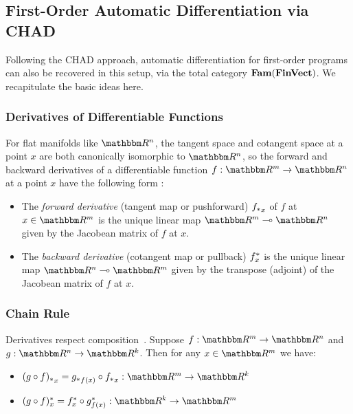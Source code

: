 
\subsection{First-Order Automatic Differentiation via CHAD}

Following the CHAD approach, automatic differentiation for first-order programs can also be recovered in this
setup, via the total category $\mathbf{Fam}(\mathbf{FinVect})$. We recapitulate the basic ideas here.

\subsubsection{Derivatives of Differentiable Functions}

For flat manifolds like $\RR^n$, the tangent space and cotangent space at a point $x$ are both canonically
isomorphic to $\RR^n$, so the forward and backward derivatives of a differentiable function $f: \RR^m \to
\RR^n$ at a point $x$ have the following form :

\begin{itemize}
\item The \emph{forward derivative} (tangent map or pushforward) ${f_{*}}_x$ of $f$ at $x \in \RR^m$ is the
unique linear map $\RR^m \linearto \RR^n$ given by the Jacobean matrix of $f$ at $x$.
\item The \emph{backward derivative} (cotangent map or pullback) $f^{*}_x$ is the unique linear map
$\RR^n \linearto \RR^m$ given by the transpose (adjoint) of the Jacobean matrix of $f$ at $x$.
\end{itemize}

\subsubsection{Chain Rule}

Derivatives respect composition~\cite{spivak65}. Suppose $f: \RR^m \to \RR^n$ and $g: \RR^n \to \RR^k$. Then
for any $x \in \RR^m$ we have:

\begin{itemize}
\item $\pushf{(g \comp f)}_x = \pushf{g}_{f(x)} \comp \pushf{f}_x: \RR^m \to \RR^k$
\item $\pullf{(g \comp f)}_x = \pullf{f}_{x} \comp \pullf{g}_{f(x)}: \RR^k \to \RR^m$
\end{itemize}

